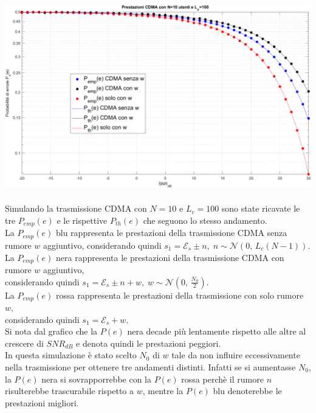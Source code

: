 \begin{adjustbox}{width=.95\paperwidth, center}
	\includegraphics{images/prestazioniCDMA1.png}
\end{adjustbox}\\\\
Simulando la trasmissione CDMA con \(N=10\) e \(L_c=100\) sono state ricavate le tre \(P_{emp}(e)\) e le rispettive \(P_{th}(e)\) che seguono lo stesso andamento.\vspace{.3cm}\\
La \(P_{emp}(e)\) blu rappresenta le prestazioni della trasmissione CDMA senza rumore \(w\) aggiuntivo, considerando quindi \(s_1 = \mathcal{E}_s \pm n, \; n\sim\mathcal{N}(0,\,L_c(N-1))\).\vspace{.3cm}\\
La \(P_{emp}(e)\) nera rappresenta le prestazioni della trasmissione CDMA con rumore \(w\) aggiuntivo,\\
considerando quindi \(s_1 = \mathcal{E}_s \pm n + w, \; w\sim\mathcal{N}(0,\,\frac{N_0}{2})\).\vspace{.3cm}\\
La \(P_{emp}(e)\) rossa rappresenta le prestazioni della trasmissione con solo rumore \(w\),\\ considerando quindi \(s_1 = \mathcal{E}_s + w\).\vspace{.3cm}\\
Si nota dal grafico che la \(P(e)\) nera decade più lentamente rispetto alle altre al crescere di \(SNR_{dB}\) e denota quindi le prestazioni peggiori.\\
In questa simulazione è stato scelto \(N_0\) di \(w\) tale da non influire eccessivamente nella trasmissione per ottenere tre andamenti distinti. Infatti se si aumentasse \(N_0\), la \(P(e)\) nera si sovrapporrebbe con la \(P(e)\) rossa perchè il rumore \(n\) risulterebbe trascurabile rispetto a \(w\), mentre la \(P(e)\) blu denoterebbe le prestazioni migliori.
